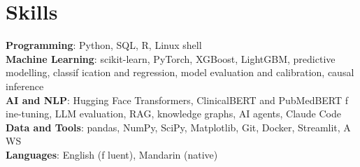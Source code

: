 \documentclass[letterpaper,11pt]{article}
\begin{document}
\section{\textbf{Skills}}
 \begin{itemize}[leftmargin=0.15in, label={}]
    \small{\item{
     \textbf{Programming}{: Python, SQL, R, Linux shell} \\
     \textbf{Machine Learning}{: scikit-learn, PyTorch, XGBoost, LightGBM, predictive modelling, classif\kern0pt ication and regression, model evaluation and calibration, causal inference} \\
     \textbf{AI and NLP}{: Hugging Face Transformers, ClinicalBERT and PubMedBERT f\kern0pt ine-tuning, LLM evaluation, RAG, knowledge graphs, AI agents, Claude Code} \\
     \textbf{Data and Tools}{: pandas, NumPy, SciPy, Matplotlib, Git, Docker, Streamlit, A\kern0pt WS} \\
     \textbf{Languages}{: English (f\kern0pt luent), Mandarin (native)}}}

 \end{itemize}
\end{document}
